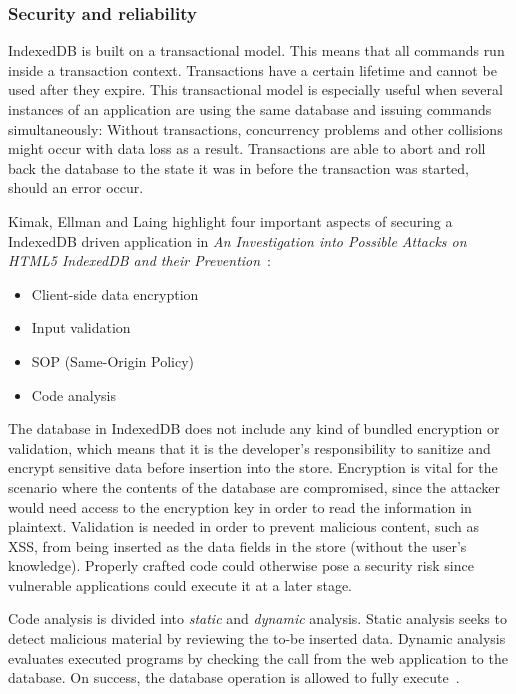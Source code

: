 \subsubsection{Security and reliability}
\label{subsec:security}
IndexedDB is built on a transactional model. This means that all commands run inside a transaction context. Transactions have a certain lifetime and cannot be used after they expire. This transactional model is especially useful when several instances of an application are using the same database and issuing commands simultaneously: Without transactions, concurrency problems and other collisions might occur with data loss as a result. Transactions are able to abort and roll back the database to the state it was in before the transaction was started, should an error occur.

Kimak, Ellman and Laing highlight four important aspects of securing a IndexedDB driven application in \emph{An Investigation into Possible Attacks on HTML5 IndexedDB and their Prevention}~\cite{IndexedDBSecurity:2012:Online}:

\begin{itemize}
  \item Client-side data encryption
  \item Input validation
  \item SOP (Same-Origin Policy)
  \item Code analysis
\end{itemize}

The database in IndexedDB does not include any kind of bundled encryption or validation, which means that it is the developer's responsibility to sanitize and encrypt sensitive data before insertion into the store. Encryption is vital for the scenario where the contents of the database are compromised, since the attacker would need access to the encryption key in order to read the information in plaintext. Validation is needed in order to prevent malicious content, such as XSS, from being inserted as the data fields in the store (without the user's knowledge). Properly crafted code could otherwise pose a security risk since vulnerable applications could execute it at a later stage.

Code analysis is divided into \emph{static} and \emph{dynamic} analysis. Static analysis seeks to detect malicious material by reviewing the to-be inserted data. Dynamic analysis evaluates executed programs by checking the call from the web application to the database. On success, the database operation is allowed to fully execute~\cite{IndexedDBSecurity:2012:Online}.


